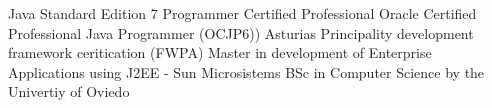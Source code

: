 %
%
%


\begin{scholarship}
					{Java Standard Edition 7 Programmer Certified Professional}
					{Oracle Certified Professional Java Programmer (OCJP6))}
					{Asturias Principality development framework ceritication (FWPA)}
					{Master in development of Enterprise Applications using J2EE - Sun Microsistems}
					{BSc in Computer Science by the Univertiy of Oviedo}
\end{scholarship}
